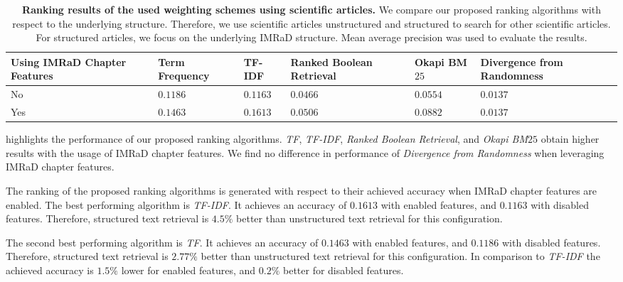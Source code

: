 \begin{table}[b!]
    \centering
    \begin{tabular}{ C{2.1cm} C{2.1cm} C{2.1cm} C{2.1cm} C{2.1cm} C{2.1cm} }
      \toprule
      \textbf{Using IMRaD Chapter Features} & \textbf{Term Frequency} & \textbf{TF-IDF} & \textbf{Ranked Boolean Retrieval} & \textbf{Okapi BM$25$} & \textbf{Divergence from Randomness} \\ \midrule
      No  & $0.1186$ & $0.1163$ & $0.0466$ & $0.0554$ & $0.0137$ \\
      Yes & $0.1463$ & $0.1613$ & $0.0506$ & $0.0882$ & $0.0137$ \\
      \bottomrule
    \end{tabular}
  \caption[Ranking results using scientific articles]{\textbf{Ranking results of the used weighting schemes using scientific articles.} We compare our proposed ranking algorithms with respect to the underlying structure. Therefore, we use scientific articles unstructured and structured to search for other scientific articles. For structured articles, we focus on the underlying IMRaD structure. Mean average precision was used to evaluate the results.}
  \label{tbl:ranking_result_full}
\end{table}

 highlights the performance of our proposed ranking algorithms. \textit{TF}, \textit{TF-IDF}, \textit{Ranked Boolean Retrieval}, and \textit{Okapi BM$25$} obtain higher results with the usage of IMRaD chapter features. We find no difference in performance of \textit{Divergence from Randomness} when leveraging IMRaD chapter features.

The ranking of the proposed ranking algorithms is generated with respect to their achieved accuracy when IMRaD chapter features are enabled. The best performing algorithm is \textit{TF-IDF}. It achieves an accuracy of $0.1613$ with enabled features, and $0.1163$ with disabled features. Therefore, structured text retrieval is $4.5 \%$ better than unstructured text retrieval for this configuration.

The second best performing algorithm is \textit{TF}. It achieves an accuracy of $0.1463$ with enabled features, and $0.1186$ with disabled features. Therefore, structured text retrieval is $2.77 \%$ better than unstructured text retrieval for this configuration. In comparison to \textit{TF-IDF} the achieved accuracy is $1.5 \%$ lower for enabled features, and $0.2 \%$ better for disabled features.

